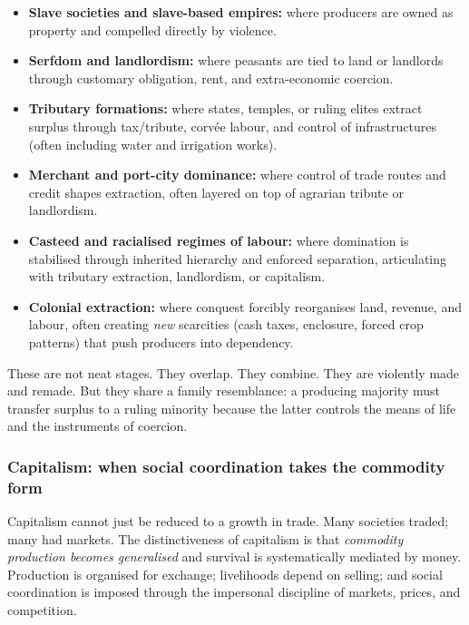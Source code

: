 \begin{itemize}[leftmargin=1.5em]
  \item \textbf{Slave societies and slave-based empires:} where producers are owned as property and compelled directly by violence.
  \item \textbf{Serfdom and landlordism:} where peasants are tied to land or landlords through customary obligation, rent, and extra-economic coercion.
  \item \textbf{Tributary formations:} where states, temples, or ruling elites extract surplus through tax/tribute, corvée labour,
        and control of infrastructures (often including water and irrigation works).
  \item \textbf{Merchant and port-city dominance:} where control of trade routes and credit shapes extraction, often layered on top of agrarian tribute or landlordism.
  \item \textbf{Casteed and racialised regimes of labour:} where domination is stabilised through inherited hierarchy and enforced separation,
        articulating with tributary extraction, landlordism, or capitalism.
  \item \textbf{Colonial extraction:} where conquest forcibly reorganises land, revenue, and labour, often creating \emph{new} scarcities
        (cash taxes, enclosure, forced crop patterns) that push producers into dependency.\cite{Marx1867}
\end{itemize}

These are not neat stages. They overlap. They combine. They are violently made and remade. But they share a family resemblance:
a producing majority must transfer surplus to a ruling minority because the latter controls the means of life and the instruments of coercion.

\subsubsection{Capitalism: when social coordination takes the commodity form}
\label{sec:capitalism-commodityform}

Capitalism cannot just be reduced to a growth in trade. Many societies traded; many had markets. The distinctiveness of capitalism is that
\emph{commodity production becomes generalised} and survival is systematically mediated by money. Production is organised for
exchange; livelihoods depend on selling; and social coordination is imposed through the impersonal discipline of markets, prices,
and competition.

